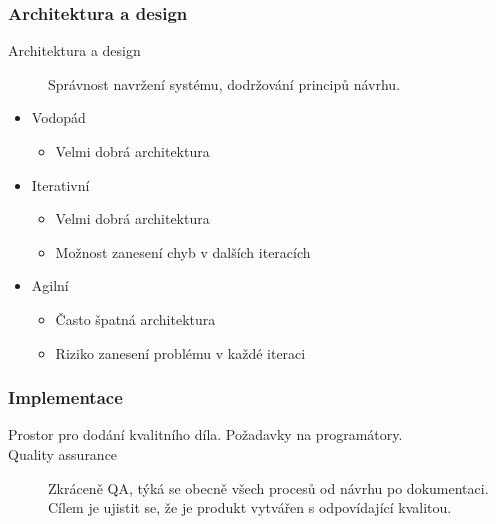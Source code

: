         \subsubsection{Architektura a design}
          \begin{description}
            \item[Architektura a design] Správnost navržení systému, dodržování principů návrhu.
          \end{description}

          \begin{itemize}
            \item Vodopád
              \begin{itemize}
                \item Velmi dobrá architektura
              \end{itemize}
            \item Iterativní
              \begin{itemize}
                \item Velmi dobrá architektura
                \item Možnost zanesení chyb v dalších iteracích
              \end{itemize}
            \item Agilní
              \begin{itemize}
                \item Často špatná architektura
                \item Riziko zanesení problému v každé iteraci
              \end{itemize}
          \end{itemize}

          \subsubsection{Implementace}
            \begin{description}
              \item[Prostor pro dodání kvalitního díla. Požadavky na programátory.]
              \item[Quality assurance] Zkráceně QA, týká se obecně všech procesů od návrhu po dokumentaci.
              Cílem je ujistit se, že je produkt vytvářen s odpovídající kvalitou.
            \end{description}

